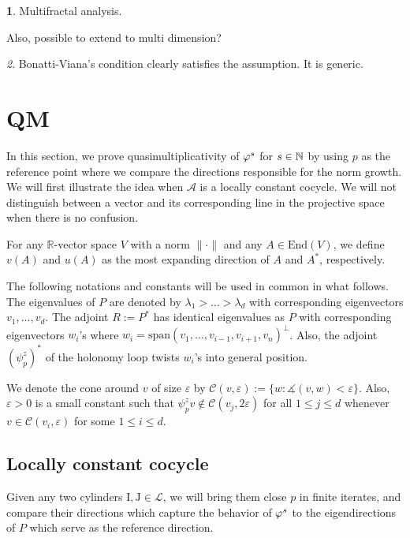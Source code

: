 \documentclass[11pt,oneside,reqno]{amsart}
\numberwithin{equation}{section}
\numberwithin{figure}{section}
\theoremstyle{definition}
\newtheorem{thm}{\protect\theoremname}[section]
\theoremstyle{definition}
\theoremstyle{definition}
\theoremstyle{definition}
\theoremstyle{remark}
\newtheorem{rem}[thm]{\protect\remarkname}
\theoremstyle{definition}
\theoremstyle{definition}
\theoremstyle{definition}
\def\A{\mathcal{A}}
\def\L{\mathcal{L}}
\def\R{\mathbb{R}}
\def\CC{\mathcal{C}}
\def\I{\mathrm{I}}
\def\J{\mathrm{J}}
\def\vps{\vphi^s}
\def\ep{\varepsilon}
\def\mangle{\measuredangle}
\providecommand{\remarkname}{Remark}
\providecommand{\theoremname}{Theorem}
\providecommand{\theoremname}{Theorem}
\begin{document}
\begin{thm}
Multifractal analysis.
\end{thm}
Also, possible to extend to multi dimension?

\begin{rem}
Bonatti-Viana's condition clearly satisfies the assumption. It is generic.
\end{rem}



\newpage
\section{QM}
In this section, we prove quasimultiplicativity of $\vps$ for $s\in \mathbb{N}$ by using $p$ as the reference point where we compare the directions responsible for the norm growth. We will first illustrate the idea when $\A$ is a locally constant cocycle. We will not distinguish between a vector and its corresponding line in the projective space when there is no confusion.


For any $\R$-vector space $V$ with a norm $\|\cdot\|$ and any $A \in \text{End}(V)$, we define $v(A)$ and $u(A)$ as the most expanding direction of $A$ and $A^*$, respectively. 

The following notations and constants will be used in common in what follows. The eigenvalues of $P$ are denoted by $\lambda_1 > \ldots > \lambda_d$ with corresponding eigenvectors $v_1,\ldots,v_d$. The adjoint $R:=P^*$ has identical eigenvalues as $P$ with corresponding eigenvectors $w_i$'s where $w_i = \text{span}(v_1,\ldots,v_{i-1},v_{i+1},v_{n})^\perp$. Also, the adjoint $(\psi_p^z)^*$ of the holonomy loop twists $w_i$'s into general position.

We denote the cone around $v$ of size $\ep$ by $\CC(v,\ep):=\{w \colon \mangle (v,w ) < \ep\}$. Also, $\ep>0$ is a small constant such that $\psi_p^zv \not \in \CC(v_j,2\ep)$ for all $1 \leq j \leq d$ whenever $v \in \CC(v_i,\ep)$ for some $1 \leq i \leq d$. 

\subsection{Locally constant cocycle}

Given any two cylinders $\I,\J \in \L$, we will bring them close $p$ in finite iterates, and compare their directions which capture the behavior of $\vps$ to the eigendirections of $P$ which serve as the reference direction.
\end{document}
